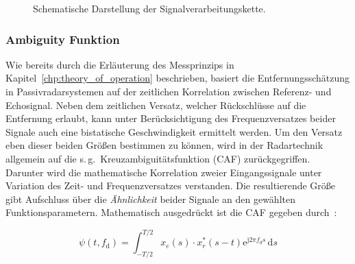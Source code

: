 \begin{figure}[htb]
    \caption{Schematische Darstellung der Signalverarbeitungskette.}\label{fig:signal_processing_chain}
\end{figure}

\subsubsection{Ambiguity Funktion}\label{sct:ambiguity_function}

Wie bereits durch die Erläuterung des Messprinzips in Kapitel~\ref{chp:theory_of_operation} beschrieben, basiert die Entfernungsschätzung in Passivradarsystemen auf der zeitlichen Korrelation zwischen Referenz- und Echosignal. Neben dem zeitlichen Versatz, welcher Rückschlüsse auf die Entfernung erlaubt, kann unter Berücksichtigung des Frequenzversatzes beider Signale auch eine bistatische Geschwindigkeit ermittelt werden. Um den Versatz eben dieser beiden Größen bestimmen zu können, wird in der Radartechnik allgemein auf die s.\,g.\ Kreuzambiguitätsfunktion (CAF) zurückgegriffen. Darunter wird die mathematische Korrelation zweier Eingangssignale unter Variation des Zeit- und Frequenzversatzes verstanden. Die resultierende Größe gibt Aufschluss über die \emph{Ähnlichkeit} beider Signale an den gewählten Funktionsparametern. Mathematisch ausgedrückt ist die CAF gegeben durch~\cite[S.~132]{Malanowski2019}:

\begin{equation}\label{equ:cross_ambiguity_function}
    \psi(t, f_{\text{d}}) = \int_{-T/2}^{T/2} {x_{e}(s) \cdot x_{r}^{*}} \left( s - t \right)\mathrm{e}^{\mathrm{j} 2 \pi f_{d} s} \, \text{d} s
\end{equation}

